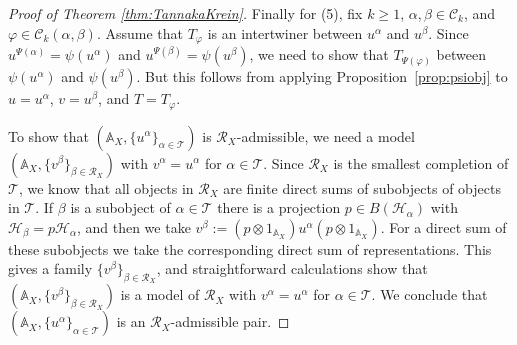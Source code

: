 \documentclass[12pt, a4paper]{amsart}
\def\A{\mathbb{A}}
\def\CC{\mathcal{C}}
\def\HH{\mathcal{H}}
\def\RR{\mathcal{R}}
\def\TT{\mathcal{T}}
\theoremstyle{definition}
\theoremstyle{remark}
\numberwithin{equation}{section}
\begin{document}
\begin{proof}[Proof of Theorem \ref{thm:TannakaKrein}]
Finally for (5), fix $k\ge 1$, $\alpha,\beta\in \CC_k$, and $\varphi\in\CC_k(\alpha,\beta)$. Assume that $T_\varphi$ is an intertwiner between $u^\alpha$ and $u^\beta$. Since $u^{\Psi(\alpha)}=\psi(u^\alpha)$ and $u^{\Psi(\beta)}=\psi(u^\beta)$, we need to show that $T_{\Psi(\varphi)}$ between $\psi(u^\alpha)$ and $\psi(u^\beta)$. But this follows from applying Proposition~\ref{prop:psiobj} to $u=u^\alpha$, $v=u^\beta$, and $T=T_\varphi$. 

To show that $(\A_X,\{u^\alpha\}_{\alpha\in\TT})$ is $\RR_X$-admissible, we need a model $(\A_X,\{v^\beta\}_{\beta\in\RR_X})$ with $v^\alpha=u^\alpha$ for $\alpha\in\TT$. Since $\RR_X$ is the smallest completion of $\TT$, we know that all objects in $\RR_X$ are finite direct sums of subobjects of objects in $\TT$. If $\beta$ is a subobject of $\alpha\in \TT$ there is a projection $p\in B(\HH_\alpha)$ with $\HH_\beta=p\HH_\alpha$, and then we take $v^\beta:=(p\otimes 1_{\A_X})u^\alpha(p\otimes 1_{\A_X})$. For a direct sum of these subobjects we take the corresponding direct sum of representations. This gives a family $\{v^\beta\}_{\beta\in\RR_X}$, and straightforward calculations show that $(\A_X,\{v^\beta\}_{\beta\in\RR_X})$ is a model of $\RR_X$ with $v^\alpha=u^\alpha$ for $\alpha\in\TT$. We conclude that $(\A_X,\{u^\alpha\}_{\alpha\in\TT})$ is an $\RR_X$-admissible pair. 



\end{proof}
\end{document}
